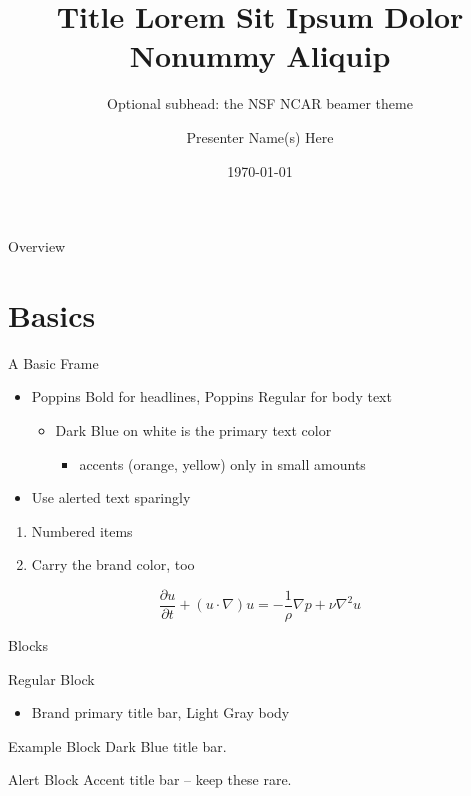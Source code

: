 \documentclass[aspectratio=\ncaraspectratio]{beamer}
\title{Title Lorem Sit Ipsum Dolor Nonummy Aliquip}
\subtitle{Optional subhead: the NSF NCAR beamer theme}
\author{Presenter Name(s) Here}
\institute{Presenter Title, CISL, NSF NCAR}
\date{\today}
\begin{document}
\begin{frame}
  \titlepage
\end{frame}

\begin{frame}{Overview}
  \tableofcontents
\end{frame}

\section{Basics}

\begin{frame}{A Basic Frame}
  \begin{itemize}
  \item Poppins Bold for headlines, Poppins Regular for body text
    \begin{itemize}
    \item Dark Blue on white is the primary text color
      \begin{itemize}
      \item accents (orange, yellow) only in small amounts
      \end{itemize}
    \end{itemize}
  \item Use \alert{alerted text} sparingly
  \end{itemize}
  \begin{enumerate}
  \item Numbered items
  \item Carry the brand color, too
  \end{enumerate}
  \begin{equation}
    \frac{\partial u}{\partial t} + (u\cdot\nabla)u = -\frac{1}{\rho}\nabla p + \nu\nabla^2 u
  \end{equation}
\end{frame}

\begin{frame}{Blocks}
  \begin{block}{Regular Block}
    \begin{itemize}
    \item Brand primary title bar, Light Gray body
    \end{itemize}
  \end{block}
  \begin{exampleblock}{Example Block}
    Dark Blue title bar.
  \end{exampleblock}
  \begin{alertblock}{Alert Block}
    Accent title bar -- keep these rare.
  \end{alertblock}
\end{frame}
\end{document}
